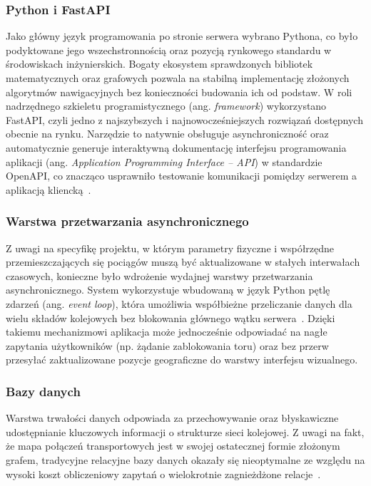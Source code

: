 \documentclass[twoside]{projektInzynierskiMS1z}
\begin{document}
\subsubsection{Python i FastAPI}

Jako główny język programowania po stronie serwera wybrano Pythona, co było podyktowane
jego wszechstronnością oraz pozycją rynkowego standardu w środowiskach inżynierskich.
Bogaty ekosystem sprawdzonych bibliotek matematycznych oraz grafowych pozwala na
stabilną implementację złożonych algorytmów nawigacyjnych bez konieczności budowania
ich od podstaw. W roli nadrzędnego szkieletu programistycznego (ang. \emph{framework})
wykorzystano FastAPI, czyli jedno z najszybszych i najnowocześniejszych rozwiązań
dostępnych obecnie na rynku. Narzędzie to natywnie obsługuje asynchroniczność oraz
automatycznie generuje interaktywną dokumentację interfejsu programowania aplikacji
(ang. \emph{Application Programming Interface -- API}) w standardzie OpenAPI, co znacząco
usprawniło testowanie komunikacji pomiędzy serwerem a aplikacją kliencką~\cite{fastapi}.

\subsubsection{Warstwa przetwarzania asynchronicznego}

Z uwagi na specyfikę projektu, w którym parametry fizyczne i współrzędne
przemieszczających się pociągów muszą być aktualizowane w stałych interwałach
czasowych, konieczne było wdrożenie wydajnej warstwy przetwarzania asynchronicznego.
System wykorzystuje wbudowaną w język Python pętlę zdarzeń (ang. \emph{event loop}),
która umożliwia współbieżne przeliczanie danych dla wielu składów kolejowych bez
blokowania głównego wątku serwera~\cite{pythonasyncio}. Dzięki takiemu mechanizmowi
aplikacja może jednocześnie odpowiadać na nagłe zapytania użytkowników (np. żądanie
zablokowania toru) oraz bez przerw przesyłać zaktualizowane pozycje geograficzne do
warstwy interfejsu wizualnego.

\subsubsection{Bazy danych}

Warstwa trwałości danych odpowiada za przechowywanie oraz błyskawiczne udostępnianie
kluczowych informacji o strukturze sieci kolejowej. Z uwagi na fakt, że mapa połączeń
transportowych jest w swojej ostatecznej formie złożonym grafem, tradycyjne relacyjne
bazy danych okazały się nieoptymalne ze względu na wysoki koszt obliczeniowy zapytań
o wielokrotnie zagnieżdżone relacje~\cite{graphdatabases}.
\end{document}
